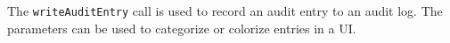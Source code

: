 The \verb+writeAuditEntry+ call is used to record an audit entry to an audit log. The parameters
can be used to categorize or colorize entries in a UI.
